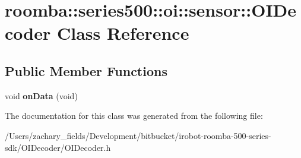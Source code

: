 \hypertarget{classroomba_1_1series500_1_1oi_1_1sensor_1_1_o_i_decoder}{\section{roomba\+:\+:series500\+:\+:oi\+:\+:sensor\+:\+:O\+I\+Decoder Class Reference}
\label{classroomba_1_1series500_1_1oi_1_1sensor_1_1_o_i_decoder}
}
\subsection*{Public Member Functions}
\begin{DoxyCompactItemize}
\item 
\hypertarget{classroomba_1_1series500_1_1oi_1_1sensor_1_1_o_i_decoder_afcec5a473f9eb84a513baec8fd222342}{void {\bfseries on\+Data} (void)}\label{classroomba_1_1series500_1_1oi_1_1sensor_1_1_o_i_decoder_afcec5a473f9eb84a513baec8fd222342}

\end{DoxyCompactItemize}


The documentation for this class was generated from the following file\+:\begin{DoxyCompactItemize}
\item 
/\+Users/zachary\+\_\+fields/\+Development/bitbucket/irobot-\/roomba-\/500-\/series-\/sdk/\+O\+I\+Decoder/O\+I\+Decoder.\+h\end{DoxyCompactItemize}

